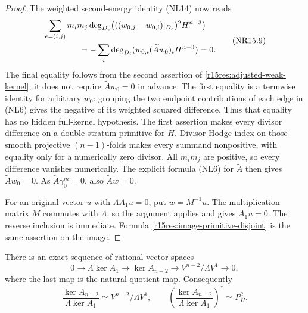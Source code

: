 \begin{proof}
The weighted second-energy identity (NL14) now reads
\[
 \begin{split}
 &\sum_{e=(i,j)}m_im_j
             \deg_{D_e}\bigl(((w_{0,j}-w_{0,i})|_{D_e})^2H^{n-3}\bigr)\\
 &\hspace{15mm}=-\sum_i
             \deg_{D_i}(w_{0,i}(\widetilde Aw_0)_iH^{n-3})=0.
 \end{split}
\tag{NR15.9}\label{r15res:weak-energy}
\]
The final equality follows from the second assertion of
\eqref{r15res:adjusted-weak-kernel}; it does not require
$\widetilde Aw_0=0$ in advance.
The first equality is a termwise identity for arbitrary $w_0$:
grouping the two endpoint contributions of each edge in (NL6)
gives the negative of its weighted squared difference.
Thus that equality has no hidden full-kernel hypothesis.
The first assertion makes every divisor difference on a
double stratum primitive for $H$.  Divisor Hodge index on
those smooth projective $(n-1)$-folds makes every summand
nonpositive, with equality only for a numerically zero
divisor.  All $m_im_j$ are positive, so every difference
vanishes numerically.  The explicit formula (NL6) for
$\widetilde A$ then gives $\widetilde Aw_0=0$.
As $\widetilde A\gamma_0^m=0$, also $\widetilde Aw=0$.

For an original vector $u$ with $\Lambda A_1u=0$, put
$w=M^{-1}u$.  The multiplication matrix $M$ commutes with
$\Lambda$, so the argument applies and gives $A_1u=0$.
The reverse inclusion is immediate.  Formula
\eqref{r15res:image-primitive-disjoint} is the same assertion
on the image.
\end{proof}

\begin{proposition}
\label{r15res:kernel-quotient}
There is an exact sequence of rational vector spaces
\[
 0\longrightarrow\Lambda\ker A_1
   \longrightarrow\ker A_{n-2}
   \longrightarrow V^{n-2}/\Lambda V^1
   \longrightarrow0,
\tag{NR15.10}\label{r15res:exact-sequence}
\]
where the last map is the natural quotient map.
Consequently
\[
 \frac{\ker A_{n-2}}{\Lambda\ker A_1}
          \simeq V^{n-2}/\Lambda V^1,
 \qquad
 \left(\frac{\ker A_{n-2}}{\Lambda\ker A_1}\right)^*
          \simeq P_H^2.
\tag{NR15.11}\label{r15res:canonical-residual-space}
\]
\end{proposition}

